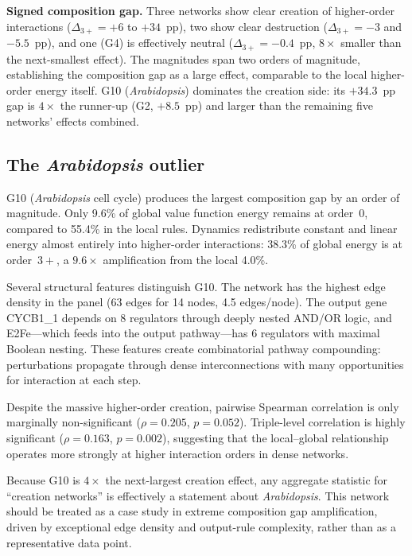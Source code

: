 \documentclass[11pt]{article}
\begin{document}
\textbf{Signed composition gap.}
Three networks show clear creation of higher-order interactions
($\Delta_{3+} = +6$ to $+34$~pp), two show clear destruction
($\Delta_{3+} = -3$ and $-5.5$~pp), and one (G4) is effectively
neutral ($\Delta_{3+} = -0.4$~pp, $8\times$ smaller than the
next-smallest effect). The magnitudes span two orders of magnitude,
establishing the composition gap as a large effect, comparable to
the local higher-order energy itself. G10 (\emph{Arabidopsis})
dominates the creation side: its $+34.3$~pp gap is $4\times$ the
runner-up (G2, $+8.5$~pp) and larger than the remaining five networks'
effects combined.


\subsection{The \emph{Arabidopsis} outlier}
\label{sec:arabidopsis}

G10 (\emph{Arabidopsis} cell cycle) produces the largest composition
gap by an order of magnitude. Only 9.6\% of global value function
energy remains at order~0, compared to 55.4\% in the local rules.
Dynamics redistribute constant and linear energy almost entirely into
higher-order interactions: 38.3\% of global energy is at order~$3+$,
a $9.6\times$ amplification from the local 4.0\%.

Several structural features distinguish G10. The network has the
highest edge density in the panel (63 edges for 14 nodes, 4.5
edges/node). The output gene CYCB1\_1 depends on 8 regulators through
deeply nested AND/OR logic, and E2Fe---which feeds into the output
pathway---has 6 regulators with maximal Boolean nesting. These
features create combinatorial pathway compounding: perturbations
propagate through dense interconnections with many opportunities for
interaction at each step.

Despite the massive higher-order creation, pairwise Spearman
correlation is only marginally non-significant ($\rho = 0.205$,
$p = 0.052$). Triple-level correlation is highly significant
($\rho = 0.163$, $p = 0.002$), suggesting that the local--global
relationship operates more strongly at higher interaction orders in
dense networks.

Because G10 is $4\times$ the next-largest creation effect, any
aggregate statistic for ``creation networks'' is effectively a
statement about \emph{Arabidopsis}. This network should be treated
as a case study in extreme composition gap amplification, driven by
exceptional edge density and output-rule complexity, rather than as
a representative data point.
\end{document}
